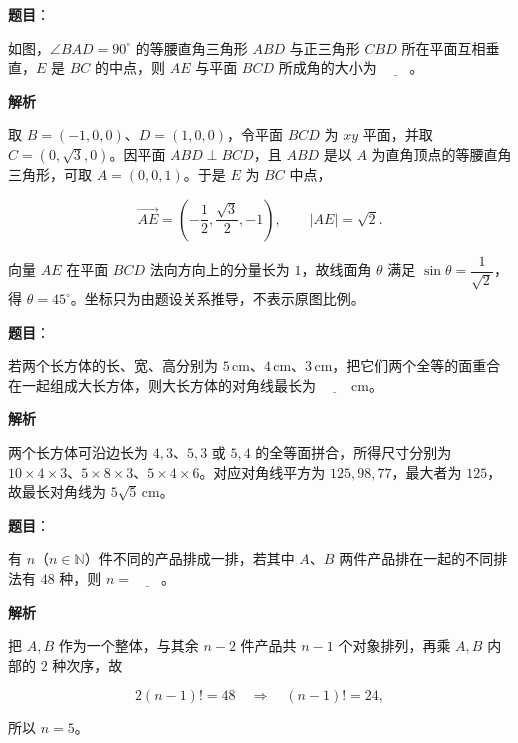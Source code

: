 \begin{answer}

\textbf{题目}：

如图，$\angle BAD=90^\circ$ 的等腰直角三角形 $ABD$ 与正三角形 $CBD$ 所在平面互相垂直，$E$ 是 $BC$ 的中点，则 $AE$ 与平面 $BCD$ 所成角的大小为 $\underline{\qquad}$。
\nopagebreak[4]
\begin{center}\end{center}
\nopagebreak[4]
\textbf{解析}

取 $B=(-1,0,0)$、$D=(1,0,0)$，令平面 $BCD$ 为 $xy$ 平面，并取 $C=(0,\sqrt3,0)$。因平面 $ABD\perp BCD$，且 $ABD$ 是以 $A$ 为直角顶点的等腰直角三角形，可取 $A=(0,0,1)$。于是 $E$ 为 $BC$ 中点，

\nopagebreak[4]
\[
\overrightarrow{AE}=\left(-\frac12,\frac{\sqrt3}{2},-1\right),\qquad |AE|=\sqrt2.
\]

向量 $AE$ 在平面 $BCD$ 法向方向上的分量长为 $1$，故线面角 $\theta$ 满足 $\sin\theta=\dfrac1{\sqrt2}$，得 $\theta=45^\circ$。坐标只为由题设关系推导，不表示原图比例。


\end{answer}
\begin{answer}

\textbf{题目}：

若两个长方体的长、宽、高分别为 $5\,\mathrm{cm}$、$4\,\mathrm{cm}$、$3\,\mathrm{cm}$，把它们两个全等的面重合在一起组成大长方体，则大长方体的对角线最长为 $\underline{\qquad}\,\mathrm{cm}$。

\textbf{解析}

两个长方体可沿边长为 $4,3$、$5,3$ 或 $5,4$ 的全等面拼合，所得尺寸分别为 $10\times4\times3$、$5\times8\times3$、$5\times4\times6$。对应对角线平方为 $125,98,77$，最大者为 $125$，故最长对角线为 $5\sqrt5\,\mathrm{cm}$。


\end{answer}
\begin{answer}

\textbf{题目}：

有 $n$（$n\in\mathbb{N}$）件不同的产品排成一排，若其中 $A$、$B$ 两件产品排在一起的不同排法有 $48$ 种，则 $n=\underline{\qquad}$。

\textbf{解析}

把 $A,B$ 作为一个整体，与其余 $n-2$ 件产品共 $n-1$ 个对象排列，再乘 $A,B$ 内部的 $2$ 种次序，故

\nopagebreak[4]
\[
2(n-1)!=48\quad\Longrightarrow\quad(n-1)!=24,
\]

所以 $n=5$。


\end{answer}
